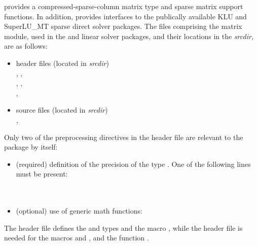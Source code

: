 {\sundials} provides a compressed-sparse-column matrix type and sparse
matrix support functions.  In addition, {\sundials} provides interfaces
to the publically available KLU and SuperLU\_MT sparse direct solver packages.
The files comprising the {\sls} matrix module, used in the {\klu} and
{\superlumt} linear solver packages, and their locations
in the {\sundials} {\em srcdir}, are as follows:
\begin{itemize}
\item header files (located in {\em srcdir})\\
  , , \\
  , , \\
  ,  
\item source files (located in {\em srcdir})\\
  , 
\end{itemize}
Only two of the preprocessing directives in the header file  
are relevant to the {\sls} package by itself:
\begin{itemize}
\item (required) definition of the precision of the {\sundials} type . 
  One of the following lines must be present:\\
  \\
  \\
\item (optional) use of generic math functions:
\end{itemize}
The  header file defines the {\sundials}  and
 types and the macro , while the 
header file is needed for the macros  and , and the
function .

